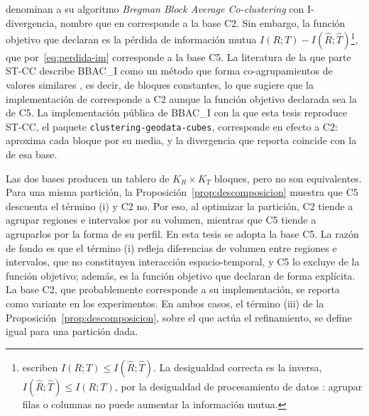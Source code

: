 \cite{Liu2021} denominan a su algoritmo \emph{Bregman Block Average
Co-clustering} con I-divergencia, nombre que en \cite[Sec.~3]{Banerjee2007}
corresponde a la base C2. Sin embargo, la función objetivo que declaran es la
pérdida de información mutua $I(R;T) - I(\hat{R};\hat{T})$\footnote{\cite{Liu2021}
escriben $I(R;T) \le I(\hat{R};\hat{T})$. La desigualdad correcta es la inversa,
$I(\hat{R};\hat{T}) \le I(R;T)$, por la desigualdad de procesamiento de datos
\cite{Cover2006}: agrupar filas o columnas no puede aumentar la información
mutua.}, que por~\eqref{eq:perdida-im} corresponde a la base C5. La literatura de
la que parte ST-CC describe BBAC\_I como un método que forma co-agrupamientos de
valores similares \cite{Wu2022}, es decir, de bloques constantes, lo que sugiere
que la implementación de \cite{Liu2021} corresponde a C2 aunque la función
objetivo declarada sea la de C5. La implementación pública de BBAC\_I con la que
esta tesis reproduce ST-CC, el paquete \texttt{clustering-geodata-cubes},
corresponde en efecto a C2: aproxima cada bloque por su media, y la divergencia
que reporta coincide con la de esa base.

Las dos bases producen un tablero de $K_R \times K_T$ bloques, pero no son
equivalentes. Para una misma partición, la Proposición~\ref{prop:descomposicion} muestra que C5 descuenta
el término (i) y C2 no. Por eso, al optimizar la partición, C2 tiende a agrupar
regiones e intervalos por su volumen, mientras que C5 tiende a agruparlos por la
forma de su perfil.
En esta tesis se adopta la base C5. La razón de fondo es que el término (i)
refleja diferencias de volumen entre regiones e intervalos, que no constituyen
interacción espacio-temporal, y C5 lo excluye de la función objetivo; además, es
la función objetivo que \cite{Liu2021} declaran de forma explícita. La base C2,
que probablemente corresponde a su implementación, se reporta como variante en los
experimentos. En ambos casos, el término (iii) de la Proposición~\ref{prop:descomposicion}, sobre el que
actúa el refinamiento, se define igual para una partición dada.

